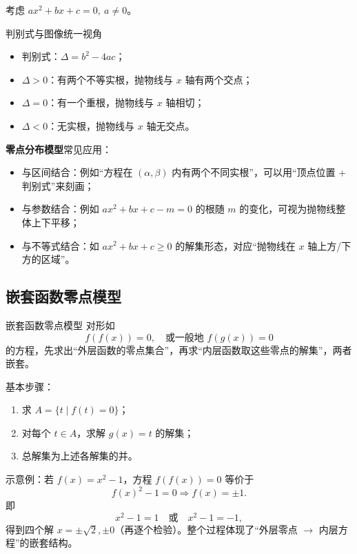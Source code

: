 \documentclass[a4paper,11pt]{ctexart}
\begin{document}
考虑 $ax^2+bx+c=0,\ a\ne0$。

\begin{summarybox}[mathnote coverage=line]{判别式与图像统一视角}
  \begin{itemize}
    \item 判别式：$\Delta=b^2-4ac$；
    \item $\Delta>0$：有两个不等实根，抛物线与 $x$ 轴有两个交点；
    \item $\Delta=0$：有一个重根，抛物线与 $x$ 轴相切；
    \item $\Delta<0$：无实根，抛物线与 $x$ 轴无交点。
  \end{itemize}
\end{summarybox}

\textbf{零点分布模型}常见应用：

\begin{itemize}
  \item 与区间结合：例如“方程在 $(\alpha,\beta)$ 内有两个不同实根”，可以用“顶点位置 + 判别式”来刻画；
  \item 与参数结合：例如 $ax^2+bx+c-m=0$ 的根随 $m$ 的变化，可视为抛物线整体上下平移；
  \item 与不等式结合：如 $ax^2+bx+c\ge0$ 的解集形态，对应“抛物线在 $x$ 轴上方/下方的区域”。
\end{itemize}

\subsection{嵌套函数零点模型}

\begin{definitionbox}{嵌套函数零点模型}
  对形如
  \[
    f(f(x))=0,\quad\text{或一般地 }f(g(x))=0
  \]
  的方程，先求出“外层函数的零点集合”，再求“内层函数取这些零点的解集”，两者嵌套。
\end{definitionbox}

基本步骤：

\begin{enumerate}
  \item 求 $A=\{t\mid f(t)=0\}$；
  \item 对每个 $t\in A$，求解 $g(x)=t$ 的解集；
  \item 总解集为上述各解集的并。
\end{enumerate}

示意例：若 $f(x)=x^2-1$，方程 $f(f(x))=0$ 等价于
\[
  f(x)^2-1=0\Rightarrow f(x)=\pm1.
\]
即
\[
  x^2-1=1\quad\text{或}\quad x^2-1=-1,
\]
得到四个解 $x=\pm\sqrt{2},\pm0$（再逐个检验）。整个过程体现了“外层零点 $\to$ 内层方程”的嵌套结构。
\end{document}
